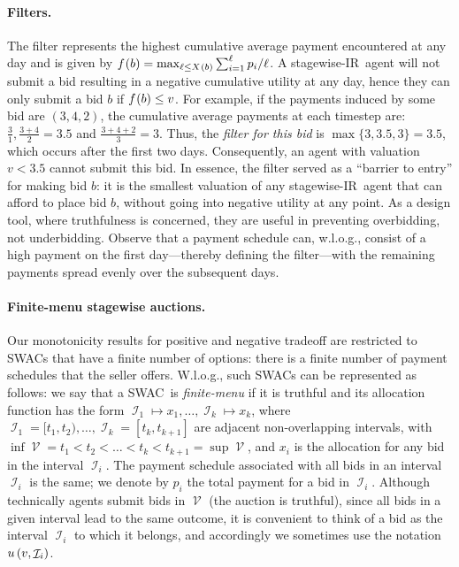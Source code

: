 \documentclass[11pt,letterpaper]{article}
\newcommand{\swir}{stagewise-IR\xspace}
\newcommand{\swac}{SWAC\xspace}
\newcommand{\swacs}{SWACs\xspace}
\newcommand{\finauc}{finite-menu \swac}
\DeclareMathOperator{\I}{\mathcal{I}}
\DeclareMathOperator{\V}{\mathcal{V}}
\newcommand{\insumi}[2]{\sum_{i={#1}}^{#2}}
\theoremstyle{plain}
\begin{document}
\paragraph{Filters.}
The filter 
represents the highest cumulative average payment encountered at any day and is given by $\f{b}=\max_{\ell\leq\x{b}}
        \insumi{1}{\ell}p_i/\ell$.
A \swir\ agent will not submit a bid resulting in a negative cumulative utility at any day, hence they can only submit a bid $b$ if $\f{b}\leq v$. 
For example, if the payments induced by some bid are $(3,4,2)$, 
the cumulative average payments at each timestep are: $
\frac{3}{1}, \frac{3+4}{2} = 3.5$ and $ \frac{3+4+2}{3} = 3$.
Thus, the \emph{filter for this bid} is \( \max \{ 3, 3.5, 3 \} = 3.5 \), which occurs after the first two days. 
Consequently, an agent with valuation \( v < 3.5 \) cannot submit this bid.
In essence, the filter served as a ``barrier to entry'' for making bid $b$:
it is the smallest valuation of any \swir\ agent that can afford
to place bid $b$,
without going into negative utility at any point. As a design tool, 
where truthfulness is concerned,
they are useful in preventing
{overbidding},
not {underbidding}. Observe that a payment schedule can, w.l.o.g., consist of a high payment on the first day—thereby defining the filter—with the remaining payments spread evenly over the subsequent days.

\paragraph{Finite-menu stagewise auctions.}
Our monotonicity results for positive and negative tradeoff are restricted to
\swacs that have a finite number of options:
there is a finite number of payment schedules
that the seller offers.
W.l.o.g., such \swacs can be represented as follows:
we say that a \swac\ is \emph{finite-menu}
if it is truthful
and its allocation function has the form
$\I_1 \mapsto x_1,\ldots, \I_k \mapsto x_k$,
where
$\I_1 = [ t_1, t_2 ), \ldots, \I_k = [t_k, t_{k+1}]$ are adjacent non-overlapping intervals,
with $\inf \V = t_1 < t_2 < \ldots < t_k < t_{k+1} = \sup \V$,
and $x_i$ is the allocation for any bid in the interval $\I_i$.
The payment schedule associated with all bids in an interval $\I_i$
is the same;
we denote by $p_i$ the total payment for a bid in $\I_i$.
Although technically agents submit bids in $\V$ (the auction is truthful),
since all bids in a given interval lead to the same outcome,
it is convenient to think of a bid as the interval $\I_i$ to which it belongs,
and accordingly we sometimes use the notation $\util{v}{\I_i}$.
\end{document}
